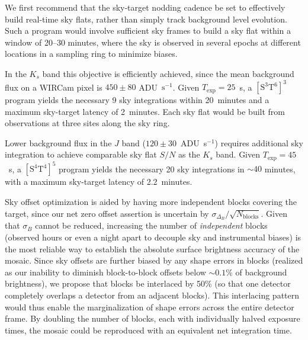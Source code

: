 \documentclass[iop]{emulateapj}
\newcommand{\todo}[1]{\textcolor{BurntOrange}{\textsf{#1}}} %
\begin{document}
We first recommend that the sky-target nodding cadence be set to effectively build real-time sky flats, rather than simply track background level evolution.
Such a program would involve sufficient sky frames to build a sky flat within a window of 20--30 minutes, where the sky is observed in several epochs at different locations in a sampling ring to minimize biases.

In the $K_s$ band this objective is efficiently achieved, since the mean background flux on a WIRCam pixel is $450 \pm 80$ ADU~$\mathrm{s^{-1}}$.
Given $T_\mathrm{exp}=25$~s, a $\mathrm{[S^3T^6]^3}$ program yields the necessary 9 sky integrations within 20~minutes and a maximum sky-target latency of 2~minutes.
Each sky flat would be built from observations at three sites along the sky ring.

Lower background flux in the $J$ band ($120 \pm 30$~ADU~s$^{-1}$) requires additional sky integration to achieve comparable sky flat $S/N$ as the $K_s$ band.
Given $T_\mathrm{exp}=45$~s, a $\mathrm{[S^4T^4]^5}$ program yields the necessary 20 sky integrations in $\sim 40$ minutes, with a maximum sky-target latency of 2.2~minutes.

Sky offset optimization is aided by having more independent blocks covering the target, since our net zero offset assertion is uncertain by $\sigma_{\Delta_B} / \sqrt{N_\mathrm{blocks}}$.
Given that $\sigma_B$ cannot be reduced, increasing the number of \emph{independent} blocks (observed hours or even a night apart to decouple sky and instrumental biases) is the most reliable way to establish the absolute surface brightness accuracy of the mosaic.
Since sky offsets are further biased by any shape errors in blocks (realized as our inability to diminish block-to-block offsets below $\sim 0.1\%$ of background brightness), we propose that blocks be interlaced by 50\% (so that one detector completely overlaps a detector from an adjacent blocks).
This interlacing pattern would thus enable the marginalization of shape errors across the entire detector frame.
By doubling the number of blocks, each with individually halved exposure times, the mosaic could be reproduced with an equivalent net integration time.
\end{document}
